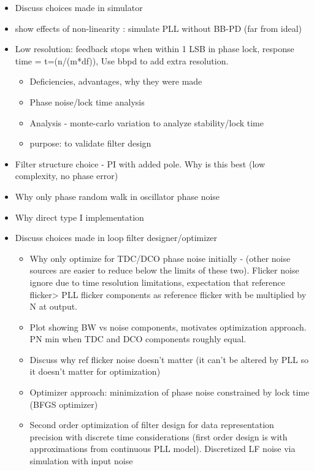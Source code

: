 \begin{itemize}
	\item Discuss choices made in simulator

	\item show effects of non-linearity : simulate PLL without BB-PD (far from ideal)

	\item Low resolution: feedback stops when within 1 LSB in phase lock, response time = t=(n/(m*df)), Use bbpd to add extra resolution.

	\begin{itemize}
		\item Deficiencies, advantages, why they were made
		\item Phase noise/lock time analysis
		\item Analysis - monte-carlo variation to analyze stability/lock time
		\item purpose: to validate filter design
	\end{itemize}
	\item Filter structure choice - PI with added pole. Why is this best (low complexity, no phase error)
	\item Why only phase random walk in oscillator phase noise
	\item Why direct type I implementation
	\item Discuss choices made in loop filter designer/optimizer
	\begin{itemize}
		\item Why only optimize for TDC/DCO phase noise initially - (other noise sources are easier to reduce below the limits of these two). Flicker noise ignore due to time resolution limitations, expectation that reference flicker> PLL flicker components as reference flicker with be multiplied by N at output.
		\item Plot showing BW vs noise components, motivates optimization approach. PN min when TDC and DCO components roughly equal.
		\item Discuss why ref flicker noise doesn't matter (it can't be altered by PLL so it doesn't matter for optimization)
		\item Optimizer approach: minimization of phase noise constrained by lock time (BFGS optimizer)
		\item Second order optimization of filter design for data representation precision with discrete time considerations (first order design is with approximations from continuous PLL model). Discretized LF noise via simulation with input noise

\end{itemize}
\end{itemize}
